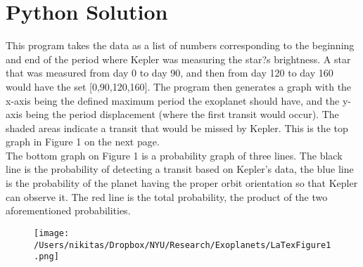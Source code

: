 \documentclass[12pt]{article}
\begin{document}
\section{Python Solution}
\indent This program takes the data as a list of numbers corresponding to the beginning and end of the period where Kepler was measuring the star?s brightness. A star that was measured from day 0 to day 90, and then from day 120 to day 160 would have the set [0,90,120,160]. The program then generates a graph with the x-axis being the defined maximum period the exoplanet should have, and the y-axis being the period displacement (where the first transit would occur). The shaded areas indicate a transit that would be missed by Kepler. This is the top graph in Figure 1 on the next page.\\
\indent The bottom graph on Figure 1 is a probability graph of three lines. The black line is the probability of detecting a transit based on Kepler's data, the blue line is the probability of the planet having the proper orbit orientation so that Kepler can observe it. The red line is the total probability, the product of the two aforementioned probabilities.


\begin{figure}[h!]
  \centering
  \texttt{[image: /Users/nikitas/Dropbox/NYU/Research/Exoplanets/LaTexFigure1.png]}
  \caption[]
  \
\end{figure}
\end{document}
